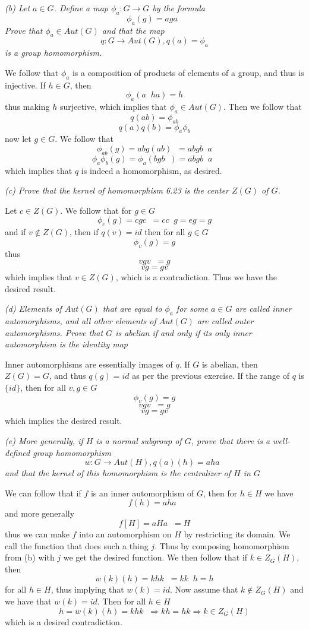 \documentclass[11pt,oneside,titlepage]{book}
\DeclareMathOperator \inv {^{-1}}
\DeclareMathOperator \ra {\Rightarrow}
\newcommand{\set}[1]{\{ #1 \}}
\begin{document}
\textit{(b) Let $a \in G$. Define a map $\phi_a: G \to G$ by the
  formula
  $$\phi_a(g) = a g a\inv$$
  Prove that $\phi_a \in Aut(G)$ and that the map
  $$q: G \to Aut(G), q(a) = \phi_a$$
  is a group homomorphism.
}

We follow that $\phi_a$ is a composition of products of elements of a
group, and thus is injective. If $h \in G$, then
$$\phi_a(a\inv h a) = h$$
thus making $h$ surjective, which implies that $\phi_a \in Aut(G)$.
Then we follow that
$$q(ab) = \phi_{ab}$$
$$q(a)q(b) = \phi_a\phi_b$$
now let $g \in G$. We follow that
$$\phi_{ab}(g) = ab g(ab)\inv = abgb\inv a$$
$$\phi_{a}\phi_{b}(g) = \phi_a(bgb\inv) = a b g b\inv a\inv$$
which implies that $q$ is indeed a homomorphism, as desired.

\textit{(c) Prove that the kernel of homomorphism 6.23 is the center
  $Z(G)$ of $G$.}

Let $c \in Z(G)$. We follow that for $g \in G$
$$\phi_c(g) = c g c\inv = c c\inv g = eg = g$$
and if $v \notin Z(G)$, then if $q(v) = id$ then for all $g \in G$
$$\phi_v(g) = g$$
thus
$$v g v\inv = g$$
$$v g = gv$$
which implies that $v \in Z(G)$, which is a contradiction. Thus we
have the desired result.

\textit{(d) Elements of $Aut(G)$ that are equal to $\phi_a$ for some
  $a \in G$ are called inner automorphisms, and all other elements of
  $Aut(G)$ are called outer automorphisms. Prove that $G$ is abelian if
  and only if its only inner automorphism is the identity map}

Inner automorphisms are essentially images of $q$.  If $G$ is abelian,
then $Z(G) = G$, and thus $q(g) = id$ as per the previous exercise. If
the range of $q$ is $\set{id}$, then for all $v ,g \in G$
$$\phi_v(g) = g$$
$$v g v\inv = g$$
$$v g  = gv$$
which implies the desired result.

\textit{(e) More generally, if $H$ is a normal subgroup of $G$, prove that
  there is a well-defined group homomorphism
  $$w: G \to Aut(H), q(a)(h) = a h a\inv $$
  and that the kernel of this homomorphism is the centralizer of $H$ in $G$
}

We can follow that if $f$ is an inner automorphism of $G$, then for $h
\in H$ we have
$$f(h) = a h a\inv$$
and more generally
$$f[H] = a H a\inv = H$$
thus we can make $f$ into an automorphism on $H$ by restricting its
domain. We call the function that does such a thing $j$.  Thus by
composing homomorphism from (b) with $j$ we get the desired function.
We then follow that if $k \in Z_G(H)$, then
$$w(k)(h) = k h k\inv = k k\inv h = h$$
for all $h \in H$, thus implying that $w(k) = id$. Now assume that
$k\notin Z_G(H)$ and we have that $w(k) = id$. Then for all $h \in H$
$$h = w(k)(h) = k h k\inv  \ra kh = hk \ra k \in Z_G(H)$$
which is a desired contradiction.
\end{document}
